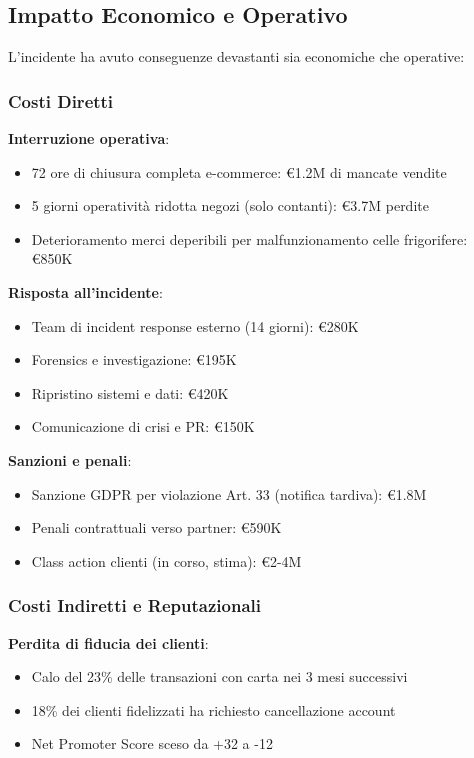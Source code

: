 \subsection{Impatto Economico e Operativo}
\label{subsec:4.8.2_impatto}

L'incidente ha avuto conseguenze devastanti sia economiche che operative:

\subsubsection{Costi Diretti}

\textbf{Interruzione operativa}: 
\begin{itemize}
    \item 72 ore di chiusura completa e-commerce: €1.2M di mancate vendite
    \item 5 giorni operatività ridotta negozi (solo contanti): €3.7M perdite
    \item Deterioramento merci deperibili per malfunzionamento celle frigorifere: €850K
\end{itemize}

\textbf{Risposta all'incidente}:
\begin{itemize}
    \item Team di incident response esterno (14 giorni): €280K
    \item Forensics e investigazione: €195K
    \item Ripristino sistemi e dati: €420K
    \item Comunicazione di crisi e PR: €150K
\end{itemize}

\textbf{Sanzioni e penali}:
\begin{itemize}
    \item Sanzione GDPR per violazione Art. 33 (notifica tardiva): €1.8M
    \item Penali contrattuali verso partner: €590K
    \item Class action clienti (in corso, stima): €2-4M
\end{itemize}

\subsubsection{Costi Indiretti e Reputazionali}

\textbf{Perdita di fiducia dei clienti}:
\begin{itemize}
    \item Calo del 23\% delle transazioni con carta nei 3 mesi successivi
    \item 18\% dei clienti fidelizzati ha richiesto cancellazione account
    \item Net Promoter Score sceso da +32 a -12
\end{itemize}

